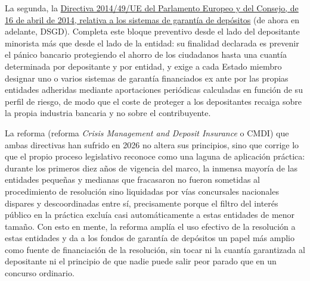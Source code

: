 \documentclass[10pt,a4paper]{article}
\begin{document}
La segunda, la \href{https://www.boe.es/buscar/doc.php?id=DOUE-L-2014-81282}{Directiva 2014/49/UE del Parlamento Europeo y del Consejo, de 16 de abril de 2014, relativa a los sistemas de garantía de depósitos} (de ahora en adelante, DSGD). Completa este bloque preventivo desde el lado del depositante minorista más que desde el lado de la entidad: su finalidad declarada es prevenir el pánico bancario protegiendo el ahorro de los ciudadanos hasta una cuantía determinada por depositante y por entidad, y exige a cada Estado miembro designar uno o varios sistemas de garantía financiados ex ante por las propias entidades adheridas mediante aportaciones periódicas calculadas en función de su perfil de riesgo, de modo que el coste de proteger a los depositantes recaiga sobre la propia industria bancaria y no sobre el contribuyente. 

La reforma (reforma \textit{Crisis Management and Deposit Insurance} o CMDI) que ambas directivas han sufrido en 2026 no altera sus principios, sino que corrige lo que el propio proceso legislativo reconoce como una laguna de aplicación práctica: durante los primeros diez años de vigencia del marco, la inmensa mayoría de las entidades pequeñas y medianas que fracasaron no fueron sometidas al procedimiento de resolución sino liquidadas por vías concursales nacionales dispares y descoordinadas entre sí, precisamente porque el filtro del interés público en la práctica excluía casi automáticamente a estas entidades de menor tamaño. Con esto en mente, la reforma amplía el uso efectivo de la resolución a estas entidades y da a los fondos de garantía de depósitos un papel más amplio como fuente de financiación de la resolución, sin tocar ni la cuantía garantizada al depositante ni el principio de que nadie puede salir peor parado que en un concurso ordinario.
\end{document}
